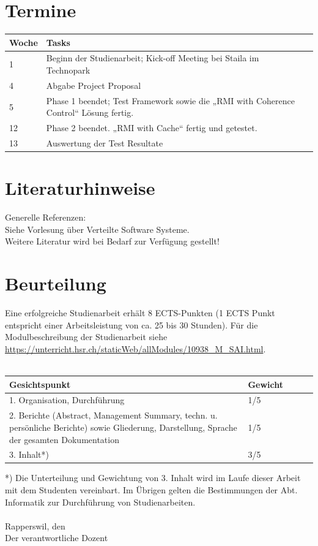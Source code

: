\documentclass{article}
\begin{document}
\section{Termine}

\begin{tabular}{l|ll}
Woche & Tasks \\ \hline
1 & Beginn der Studienarbeit; Kick-off Meeting bei Staila im Technopark \\
4 & Abgabe Project Proposal\\
5 & Phase 1 beendet; Test Framework sowie die „RMI with Coherence Control“ Lösung fertig.\\
12 &  Phase 2 beendet. „RMI with Cache“ fertig und getestet. \\
13 & Auswertung der Test Resultate
\end{tabular}

\section{Literaturhinweise}
Generelle Referenzen:\\
Siehe Vorlesung über Verteilte Software Systeme.\\
Weitere Literatur wird bei Bedarf zur Verfügung gestellt!
\section{Beurteilung}
Eine erfolgreiche Studienarbeit erhält 8 ECTS-Punkten (1 ECTS Punkt entspricht einer Arbeitsleistung von ca. 25 bis 30 Stunden). Für die Modulbeschreibung der Studienarbeit siehe 
\url{https://unterricht.hsr.ch/staticWeb/allModules/10938_M_SAI.html}.\\ \\
\begin{tabular}{l p{3cm} l l l}
Gesichtspunkt & Gewicht \\ \hline
1. Organisation, Durchführung & 1/5 \\
2. Berichte (Abstract, Management Summary, techn. u. persönliche Berichte) sowie Gliederung, Darstellung, Sprache der gesamten Dokumentation & 1/5 \\
3. Inhalt*) & 3/5
\end{tabular}
*) Die Unterteilung und Gewichtung von 3. Inhalt wird im Laufe dieser Arbeit mit dem Studenten vereinbart. Im Übrigen gelten die Bestimmungen der Abt. Informatik zur Durchführung von Studienarbeiten.\\ \\
Rapperswil, den\\
Der verantwortliche Dozent\\
\end{document}
